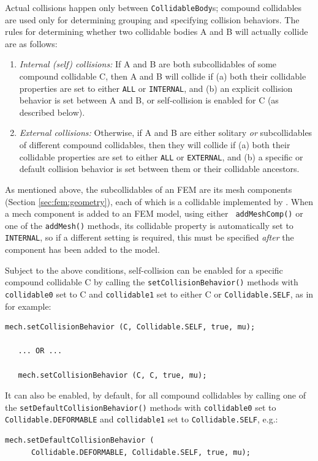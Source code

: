 Actual collisions happen only between {\tt CollidableBody}s; compound
collidables are used only for determining grouping and specifying
collision behaviors. The rules for determining whether two collidable
bodies A and B will actually collide are as follows:

\begin{enumerate}

\item {\it Internal (self) collisions:}
If A and B are both subcollidables of some compound collidable C,
then A and B will collide if (a) both their {\sf collidable}
properties are set to either {\tt ALL} or {\tt INTERNAL}, and (b) an
explicit collision behavior is set between A and B, or self-collision
is enabled for C (as described below).

\item {\it External collisions:} Otherwise, if A and B are either
solitary {\it or} subcollidables of different compound collidables,
then they will collide if (a) both their {\sf collidable} properties
are set to either {\tt ALL} or {\tt EXTERNAL}, and (b) a specific or
default collision behavior is set between them or their collidable
ancestors.

\end{enumerate}

\begin{sideblock}
As mentioned above, the subcollidables of an FEM are its mesh
components (Section \ref{sec:fem:geometry}), each of which is a
collidable implemented by 
.
When a mech component is added to an FEM model, using either {\tt
addMeshComp()} or one of the {\tt addMesh()} methods, its {\sf
collidable} property is automatically set to {\tt INTERNAL}, so if a
different setting is required, this must be specified {\it after} the
component has been added to the model.
\end{sideblock}

Subject to the above conditions, self-collision can be enabled for a
specific compound collidable C by calling the {\tt setCollisionBehavior()}
methods with {\tt collidable0} set to C and {\tt collidable1}
set to either C or {\tt Collidable.SELF}, as in for example:
%
\begin{lstlisting}[]
   mech.setCollisionBehavior (C, Collidable.SELF, true, mu);

   ... OR ...

   mech.setCollisionBehavior (C, C, true, mu);
\end{lstlisting}
%
It can also be enabled, by default, for all compound collidables by
calling one of the {\tt setDefaultCollisionBehavior()} methods with
{\tt collidable0} set to {\tt Collidable.DEFORMABLE} and {\tt collidable1}
set to {\tt Collidable.SELF}, e.g.:
%
\begin{lstlisting}[]
   mech.setDefaultCollisionBehavior (
      Collidable.DEFORMABLE, Collidable.SELF, true, mu);
\end{lstlisting}
%

